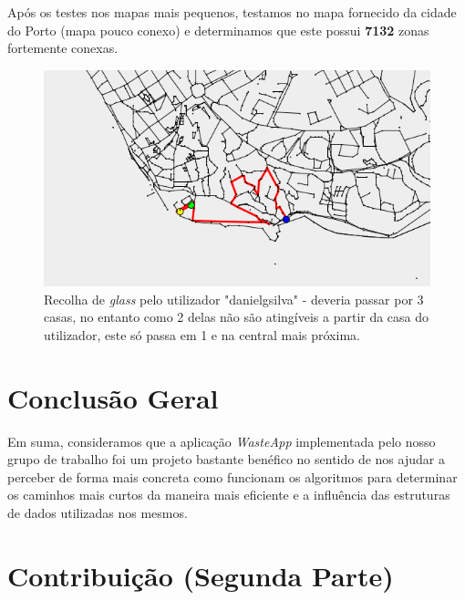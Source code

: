 \documentclass[article, a4paper, 12pt, oneside]{memoir}
\begin{document}
Após os testes nos mapas mais pequenos, testamos no mapa fornecido da cidade do Porto (mapa pouco conexo) e determinamos que este possui \textbf{7132} zonas fortemente conexas.

\begin{figure}[h!]
  \centerline{\includegraphics[scale=0.7]{porto_disconnected.png}}
  \caption{Recolha de \textit{glass} pelo utilizador "danielgsilva" - deveria passar por 3 casas, no entanto como 2 delas  não são atingíveis a partir da casa do utilizador, este só passa em 1 e na central mais próxima.}
\end{figure}

\newpage
\chapter[Conclusão Geral][Conclusão Geral]{Conclusão Geral} \label{\thechapter}

Em suma, consideramos que a aplicação \textit{WasteApp} implementada pelo nosso grupo de trabalho foi um projeto bastante benéfico no sentido de nos ajudar a perceber de forma mais concreta como funcionam os algoritmos para determinar os caminhos mais curtos da maneira mais eficiente e a influência das estruturas de dados utilizadas nos mesmos.

\newpage
\chapter[Contribuição (Segunda Parte)][Contribuição (Segunda Parte)]{Contribuição (Segunda Parte)} \label{\thechapter}
\end{document}
